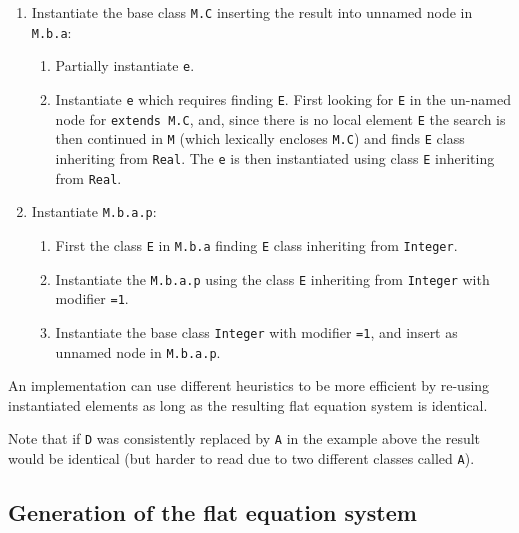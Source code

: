\begin{example}
\begin{enumerate}
\begin{enumerate}
\begin{enumerate}
\begin{enumerate}
      \end{enumerate}
    \end{enumerate}
  \end{enumerate}
\item
  Instantiate the base class \lstinline!M.C! inserting the result into unnamed node in \lstinline!M.b.a!:
  \begin{enumerate}
  \item
    Partially instantiate \lstinline!e!.
  \item
    Instantiate \lstinline!e! which requires finding \lstinline!E!.
    First looking for \lstinline!E! in the un-named node for \lstinline!extends M.C!, and, since there is no local element \lstinline!E! the search is then continued in \lstinline!M! (which lexically encloses \lstinline!M.C!) and finds \lstinline!E! class inheriting from \lstinline!Real!.
    The \lstinline!e! is then instantiated using class \lstinline!E! inheriting from \lstinline!Real!.
  \end{enumerate}
\item
  Instantiate \lstinline!M.b.a.p!:
  \begin{enumerate}
  \item
    First the class \lstinline!E! in \lstinline!M.b.a! finding \lstinline!E! class inheriting from \lstinline!Integer!.
  \item
    Instantiate the \lstinline!M.b.a.p! using the class \lstinline!E! inheriting from \lstinline!Integer! with modifier \lstinline!=1!.
  \item
    Instantiate the base class \lstinline!Integer! with modifier \lstinline!=1!, and insert as unnamed node in \lstinline!M.b.a.p!.
  \end{enumerate}
\end{enumerate}

An implementation can use different heuristics to be more efficient by re-using instantiated elements as long as the resulting flat equation system is identical.

Note that if \lstinline!D! was consistently replaced by \lstinline!A! in the example above the result would be identical (but harder to read due to two different classes called \lstinline!A!).
\end{example}


\subsection{Generation of the flat equation system}\label{generation-of-the-flat-equation-system}

